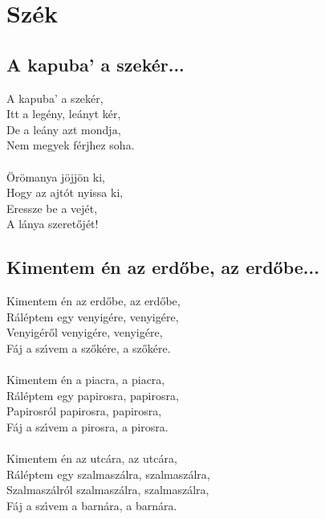 \chapter{Szék}
\section{A kapuba' a szekér...}
A kapuba’ a szekér,\\
Itt a legény, leányt kér,\\
De a leány azt mondja,\\
Nem megyek férjhez soha.\\\\
Örömanya jöjjön ki,\\
Hogy az ajtót nyissa ki,\\
Eressze be a vejét,\\
A lánya szeretőjét!\\
\section{Kimentem én az erdőbe, az erdőbe...}
Kimentem én az erdőbe, az erdőbe,\\
Ráléptem egy venyigére, venyigére,\\
Venyigéről venyigére, venyigére,\\
Fáj a szı́vem a szőkére, a szőkére.\\\\
Kimentem én a piacra, a piacra,\\
Ráléptem egy papirosra, papirosra,\\
Papirosról papirosra, papirosra,\\
Fáj a szı́vem a pirosra, a pirosra.\\\\
Kimentem én az utcára, az utcára,\\
Ráléptem egy szalmaszálra, szalmaszálra,\\
Szalmaszálról szalmaszálra, szalmaszálra,\\
Fáj a szı́vem a barnára, a barnára.\\
